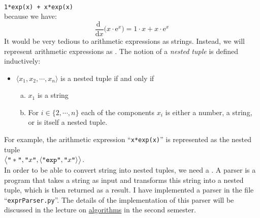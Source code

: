 \\[0.2cm]
\hspace*{1.3cm}
\texttt{1*exp(x) + x*exp(x)}
\\[0.2cm]
because we have:
$$ \frac{\mathrm{d}\;}{\mathrm{d}x} \bigl( x \cdot \mathrm{e}^x \bigr) = 1 \cdot x + x \cdot \mathrm{e}^x $$
It would be very tedious to  arithmetic expressions as strings.  Instead, we will represent
arithmetic expressions as .  
The notion of a \emph{nested tuple} is defined inductively:
\begin{itemize}
\item $\langle x_1, x_2, \cdots, x_n \rangle$ is a nested tuple if and only if
      \begin{enumerate}[(a)]
      \item $x_1$ is a string
      \item For $i \in \{2,\cdots,n\}$  each of the components $x_i$ is either a
            number, a string, or is itself a nested tuple.
      \end{enumerate}
\end{itemize}
For example, the arithmetic expression ``\texttt{x*exp(x)}'' is represented as the nested tuple
\\[0.2cm]
\hspace*{1.3cm}
$\bigl\langle\texttt{\symbol{34}}*\texttt{\symbol{34}}, \texttt{\symbol{34}}x\texttt{\symbol{34}}, \langle \texttt{\symbol{34}}\mathtt{exp}\texttt{\symbol{34}}, \texttt{\symbol{34}}x\texttt{\symbol{34}} \rangle\bigr\rangle$.
\\[0.2cm]
In order to be able to convert string into nested tuples, we need a .
  A parser is a program that
takes a string as input and transforms this string into a nested tuple, which is then returned as a result.
I have implemented a parser in the file ``\texttt{exprParser.py}''.  The details of the implementation of this
parser will be discussed in the lecture on
\href{https://github.com/karlstroetmann/Algorithms/blob/master/Lecture-Notes/algorithms.pdf}{algorithms} in the
second semester.

